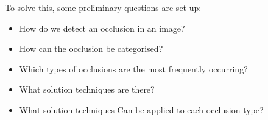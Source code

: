 To solve this, some preliminary questions are set up:
\begin{itemize}
	\item How do we detect an occlusion in an image?
	\item How can the occlusion be categorised?
	\item Which types of occlusions are the most frequently occurring?
	\item What solution techniques are there? 
	\item What solution techniques Can be applied to each occlusion type?
\end{itemize}